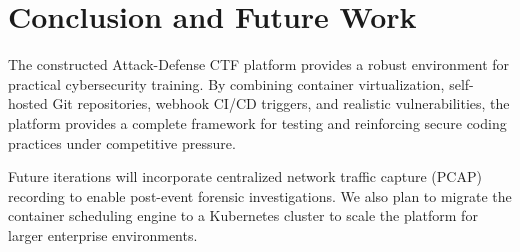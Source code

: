 \documentclass[10pt,journal,compsoc]{article}
\begin{document}
\section{Conclusion and Future Work}
The constructed Attack-Defense CTF platform provides a robust environment for practical cybersecurity training. By combining container virtualization, self-hosted Git repositories, webhook CI/CD triggers, and realistic vulnerabilities, the platform provides a complete framework for testing and reinforcing secure coding practices under competitive pressure. 

Future iterations will incorporate centralized network traffic capture (PCAP) recording to enable post-event forensic investigations. We also plan to migrate the container scheduling engine to a Kubernetes cluster to scale the platform for larger enterprise environments.
\end{document}
